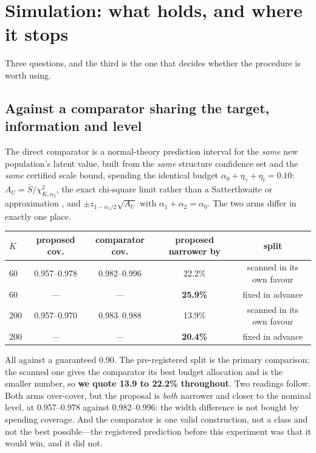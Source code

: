\section{Simulation: what holds, and where it stops}\label{sec:simulation}

Three questions, and the third is the one that decides whether the procedure is
worth using.

\subsection{Against a comparator sharing the target, information and level}

The direct comparator is a normal-theory prediction interval for the \emph{same}
new population's latent value, built from the \emph{same} structure confidence
set and the \emph{same} certified scale bound, spending the identical budget
$\alpha_0+\eta_\gamma+\eta_t=0.10$: $A_U=\bar S/\chi^2_{K,\alpha_2}$, the exact
chi-square limit rather than a Satterthwaite or \citet{graybill1980}
approximation \citep{satterthwaite1946}, and
$\pm z_{1-\alpha_1/2}\sqrt{A_U}$ with $\alpha_1+\alpha_2=\alpha_0$. The two arms
differ in exactly one place.

\begin{center}
\begin{singlespace}
\small
\begin{tabular}{lcccc}
\toprule
$K$ & proposed cov. & comparator cov. & \textbf{proposed narrower by} & split\\
\midrule
60 & 0.957--0.978 & 0.982--0.996 & 22.2\% & scanned in its own favour\\
60 & --- & --- & \textbf{25.9\%} & fixed in advance\\
200 & 0.957--0.970 & 0.983--0.988 & 13.9\% & scanned in its own favour\\
200 & --- & --- & \textbf{20.4\%} & fixed in advance\\
\bottomrule
\end{tabular}
\end{singlespace}
\end{center}

All against a guaranteed 0.90. The pre-registered split is the primary
comparison; the scanned one gives the comparator its best budget allocation and
is the smaller number, so \textbf{we quote 13.9 to 22.2\% throughout}. Two
readings follow. Both arms over-cover, but the proposal is \emph{both} narrower
and closer to the nominal level, at 0.957--0.978 against 0.982--0.996: the width
difference is not bought by spending coverage. And the comparator is one valid
construction, not a class and not the best possible---the registered prediction
before this experiment was that it would win, and it did not.

